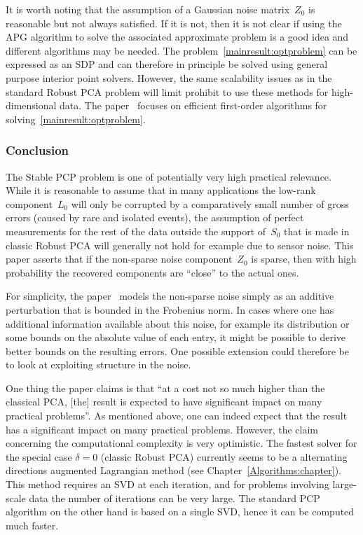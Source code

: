 It is worth noting that the assumption of a Gaussian noise matrix~$Z_0$ is reasonable but not always satisfied. If it is not, then it is not clear if using the APG algorithm to solve the associated approximate problem is a good idea and different algorithms may be needed. The problem~\eqref{mainresult:optproblem} can be expressed as an SDP and can therefore in principle be solved using general purpose interior point solvers. However, the same scalability issues as in the standard Robust PCA problem will limit prohibit to use these methods for high-dimensional data. The paper~\cite{Aybat:2011vn} focuses on efficient first-order algorithms for solving~\eqref{mainresult:optproblem}.


\subsubsection{Conclusion}

The Stable PCP problem is one of potentially very high practical relevance. While it is reasonable to assume that in many applications the low-rank component~$L_0$ will only be corrupted by a comparatively small number of gross errors (caused by rare and isolated events), the assumption of perfect measurements for the rest of the data outside the support of~$S_0$ that is made in classic Robust PCA will generally not hold for example due to sensor noise. This paper asserts that if the non-sparse noise component~$Z_0$ is sparse, then with high probability the recovered components are ``close'' to the actual ones.

For simplicity, the paper~\cite{Zhou:2010vn} models the non-sparse noise simply as an additive perturbation that is bounded in the Frobenius norm. In cases where one has additional information available about this noise, for example its distribution or some bounds on the absolute value of each entry, it might be possible to derive better bounds on the resulting errors. One possible extension could therefore be to look at exploiting structure in the noise.

One thing the paper claims is that ``at a cost not so much higher than the classical PCA, [the] result is expected to have significant impact on many practical problems''. As mentioned above, one can indeed expect that the result has a significant impact on many practical problems. However, the claim concerning the computational complexity is very optimistic. The fastest solver for the special case $\delta =0$ (classic Robust PCA) currently seems to be a alternating directions augmented Lagrangian method (see Chapter~\ref{Algorithms:chapter}). This method requires an SVD at each iteration, and for problems involving large-scale data the number of iterations can be very large. The standard PCP algorithm on the other hand is based on a single SVD, hence it can be computed much faster.


